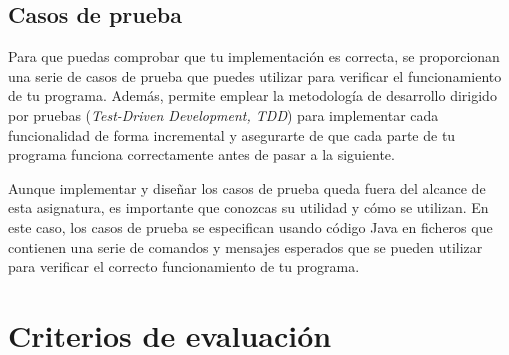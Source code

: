 \documentclass[
    a4paper, %
    12pt, %
]{CSSullivanBusinessReport}
\begin{document}
\subsection{Casos de prueba}\label{sec:casos-prueba}

Para que puedas comprobar que tu implementación es correcta, se proporcionan una serie de casos de prueba que puedes utilizar para verificar el funcionamiento de tu programa. Además, permite emplear la metodología de desarrollo dirigido por pruebas (\textit{Test-Driven Development, TDD}) para implementar cada funcionalidad de forma incremental y asegurarte de que cada parte de tu programa funciona correctamente antes de pasar a la siguiente.

Aunque implementar y diseñar los casos de prueba queda fuera del alcance de esta asignatura, es importante que conozcas su utilidad y cómo se utilizan. En este caso, los casos de prueba se especifican usando código Java en ficheros que contienen una serie de comandos y mensajes esperados que se pueden utilizar para verificar el correcto funcionamiento de tu programa.

\section{Criterios de evaluación}\label{sec:criterios-evaluacion}



\end{document}
